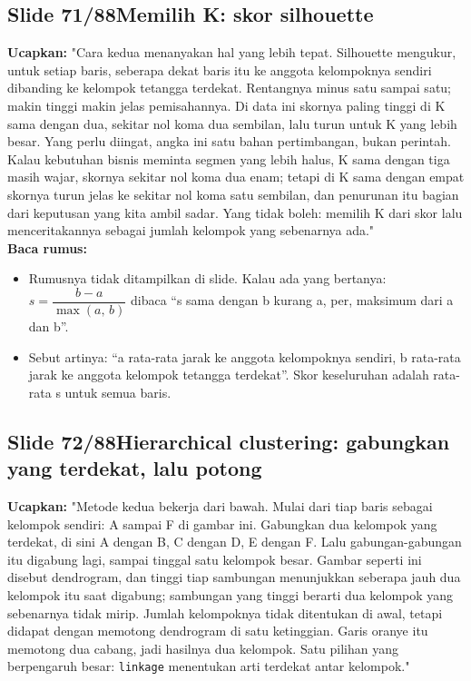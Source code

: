\documentclass[11pt]{article}
\renewcommand{\framebox}[1]{\colorbox{acc!15}{\textcolor{acc}{\textbf{#1}}}}
\begin{document}
\subsection*{\framebox{Slide 71/88}\quad Memilih K: skor silhouette}
\textbf{Ucapkan:} "Cara kedua menanyakan hal yang lebih tepat. Silhouette mengukur, untuk setiap baris, seberapa dekat baris itu ke anggota kelompoknya sendiri dibanding ke kelompok tetangga terdekat. Rentangnya minus satu sampai satu; makin tinggi makin jelas pemisahannya. Di data ini skornya paling tinggi di K sama dengan dua, sekitar nol koma dua sembilan, lalu turun untuk K yang lebih besar. Yang perlu diingat, angka ini satu bahan pertimbangan, bukan perintah. Kalau kebutuhan bisnis meminta segmen yang lebih halus, K sama dengan tiga masih wajar, skornya sekitar nol koma dua enam; tetapi di K sama dengan empat skornya turun jelas ke sekitar nol koma satu sembilan, dan penurunan itu bagian dari keputusan yang kita ambil sadar. Yang tidak boleh: memilih K dari skor lalu menceritakannya sebagai jumlah kelompok yang sebenarnya ada."\\[2pt]
\textbf{Baca rumus:}\\[2pt]
\begin{itemize}\setlength\itemsep{0.2em}
\item Rumusnya tidak ditampilkan di slide. Kalau ada yang bertanya: $s = \dfrac{b - a}{\max(a,\,b)}$ dibaca ``s sama dengan b kurang a, per, maksimum dari a dan b''.
\item Sebut artinya: ``a rata-rata jarak ke anggota kelompoknya sendiri, b rata-rata jarak ke anggota kelompok tetangga terdekat''. Skor keseluruhan adalah rata-rata s untuk semua baris.
\end{itemize}

\subsection*{\framebox{Slide 72/88}\quad Hierarchical clustering: gabungkan yang terdekat, lalu potong}
\textbf{Ucapkan:} "Metode kedua bekerja dari bawah. Mulai dari tiap baris sebagai kelompok sendiri: A sampai F di gambar ini. Gabungkan dua kelompok yang terdekat, di sini A dengan B, C dengan D, E dengan F. Lalu gabungan-gabungan itu digabung lagi, sampai tinggal satu kelompok besar. Gambar seperti ini disebut dendrogram, dan tinggi tiap sambungan menunjukkan seberapa jauh dua kelompok itu saat digabung; sambungan yang tinggi berarti dua kelompok yang sebenarnya tidak mirip. Jumlah kelompoknya tidak ditentukan di awal, tetapi didapat dengan memotong dendrogram di satu ketinggian. Garis oranye itu memotong dua cabang, jadi hasilnya dua kelompok. Satu pilihan yang berpengaruh besar: \texttt{linkage} menentukan arti terdekat antar kelompok."\\[2pt]
\end{document}
